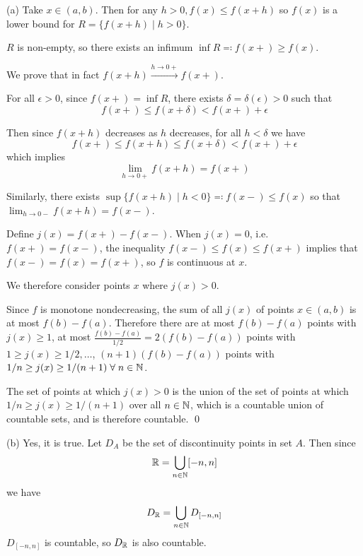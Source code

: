 \documentclass[a4paper, 11pt]{article}
\begin{document}
\begin{solution}

    (a) Take $x \in (a, b)$. Then for any $h>0, f(x) \leq f(x +h)$ so $f(x) $ is a lower bound for $R = \{f(x+h) \mid h > 0\}$. 
    
    $R$ is non-empty, so there exists an infimum $\inf R \eqqcolon f(x+) \geq f(x)$.
    
    We prove that in fact $f(x + h) \xrightarrow{h \to 0+} f(x+)$.

    For all $\epsilon > 0$, since $f(x+) = \inf R$, there exists $\delta = \delta(\epsilon) > 0$ such that \[
    f(x+) \leq f(x + \delta) < f(x+) + \epsilon
    \]

    Then since $f(x + h)$ decreases as $h$ decreases, for all $h < \delta$ we have \[
    f(x+) \leq f(x + h) \leq f(x + \delta) < f(x+) + \epsilon
    \]
    which implies \[
    \lim_{h \to 0+} f(x + h) = f(x+)
    \]

    Similarly, there exists $\sup \{f(x+h) \mid h < 0\} \eqqcolon f(x-) \leq f(x)$ so that $\lim_{h \to 0-} f(x+h) = f(x-)$.
    
    Define $j(x) = f(x+) - f(x-)$. When $j(x) = 0$, i.e. $f(x+) = f(x-)$, the inequality $f(x-) \leq f(x) \leq f(x+)$ implies that $f(x-) = f(x) = f(x+)$, so $f$ is continuous at $x$.
    
    
    We therefore consider points $x$ where $j(x) > 0$.

    Since $f$ is monotone nondecreasing, the sum of all $j(x)$ of points $x \in (a, b)$ is at most $f(b) - f(a)$. Therefore there are at most $f(b) - f(a)$ points with $j(x) \geq 1$, at most $\frac{f(b) - f(a)}{1/2} = 2(f(b) - f(a))$ points with $1 \geq j(x) \geq 1/2, \dots$,  $(n+1)(f(b) - f(a))$ points with $1/n \geq j(x) \geq 1/(n+1) \forall n \in \bbn$.
    
    The set of points at which $j(x) > 0$ is the union of the set of points at which $1/n \geq j(x) \geq 1/(n+1)$ over all $n \in \mathbb{N}$, which is a countable union of countable sets, and is therefore countable.  \qed

    (b) Yes, it is true. Let $D_A$ be the set of discontinuity points in set $A$. Then since
    \[
    \mathbb{R} = \bigcup_{n \in \mathbb{N}} [-n, n]
    \]
    we have \[
    D_{\mathbb{R}} = \bigcup_{n \in \mathbb{N}} D_{[-n, n]}
    \]
    $D_{[-n, n]}$ is countable, so $D_{\mathbb{R}}$ is also countable.
\end{solution}
\end{document}

